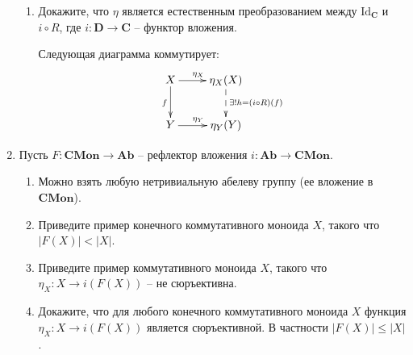 \documentclass[draft]{article}
\newcommand{\cat}[1]{\mathbf{#1}}
\renewcommand{\C}{\cat{C}}
\newcommand{\D}{\cat{D}}
\newcommand{\CMon}{\cat{CMon}}
\newcommand{\Ab}{\cat{Ab}}
\newcommand{\fs}[1]{\mathrm{#1}}
\begin{document}
\begin{enumerate}
\begin{enumerate}
\item Докажите, что $\eta$ является естественным преобразованием между $\fs{Id}_\C$ и $i \circ R$, где $i : \D \to \C$ -- функтор вложения.

Следующая диаграмма коммутирует:
\[
\xymatrix{
X \ar[r]^{\eta_X} \ar[d]_{f} & \eta_X(X) \ar@{-->}[d]^{\exists!h = (i \circ R) (f)} \\
Y \ar[r]^{\eta_Y} &  \eta_Y(Y)
}
\]
\end{enumerate}

\item Пусть $F : \CMon \to \Ab$ -- рефлектор вложения $i : \Ab \to \CMon$.
\begin{enumerate}
\item {}

Можно взять любую нетривиальную абелеву группу (ее вложение в $\CMon$).
\item Приведите пример конечного коммутативного моноида $X$, такого что $|F(X)| < |X|$.

\item Приведите пример коммутативного моноида $X$, такого что $\eta_X : X \to i(F(X))$ -- не сюръективна.
\item Докажите, что для любого конечного коммутативного моноида $X$ функция $\eta_X : X \to i(F(X))$ является сюръективной. В частности $|F(X)| \leq |X|$.
\end{enumerate}

\end{enumerate}
\end{document}
